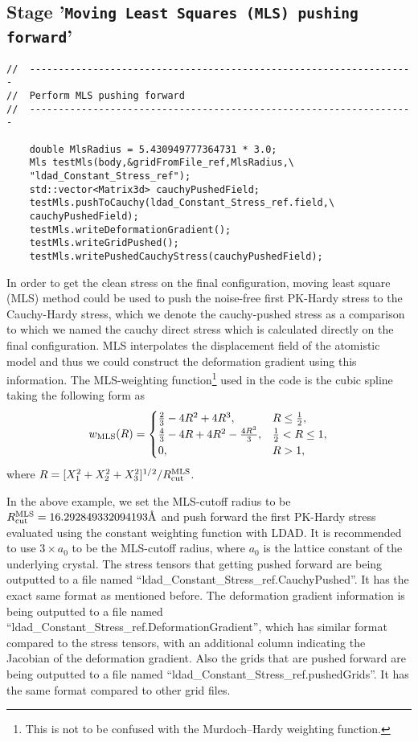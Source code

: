 \documentclass[authoryear]{elsarticle}
\newcommand{\ttt}{\texttt}
\begin{document}
\subsection{Stage \textnormal{'\ttt{Moving Least Squares (MLS) pushing forward}'}}
\begin{Verbatim}[frame=single]
//	-------------------------------------------------------------------
//	Perform MLS pushing forward
//	-------------------------------------------------------------------

	double MlsRadius = 5.430949777364731 * 3.0;
	Mls testMls(body,&gridFromFile_ref,MlsRadius,\
	"ldad_Constant_Stress_ref");
	std::vector<Matrix3d> cauchyPushedField;
	testMls.pushToCauchy(ldad_Constant_Stress_ref.field,\
	cauchyPushedField);
	testMls.writeDeformationGradient();
	testMls.writeGridPushed();
	testMls.writePushedCauchyStress(cauchyPushedField);
\end{Verbatim}

In order to get the clean stress on the final configuration, moving least square (MLS) method could be used to push the noise-free first PK-Hardy stress to the Cauchy-Hardy stress, which we denote the cauchy-pushed stress as a comparison to which we named the cauchy direct stress which is calculated directly on the final configuration.
MLS interpolates the displacement field of the atomistic model and thus we could construct the deformation gradient using this information.
The MLS-weighting function\footnote{This is not to be confused
with the Murdoch--Hardy weighting function.} used in the code is the cubic spline taking the following form as
\begin{equation}
\label{eqn:w^MLS}
w_{\rm{MLS}}(R) =
    \begin{cases}
    \frac {2} {3} - 4R^2 + 4R^3, & R \le \frac {1} {2}, \\
    \frac {4} {3} - 4R + 4R^2 - \frac {4R^3} {3}, & \frac {1} {2} < R \le 1, \\
    0, & R > 1,
    \end{cases}
\end{equation}
where $R = [X_1^2+X_2^2+X_3^2]^{1/2}/R_{\rm{cut}}^{\rm{MLS}}$.

In the above example, we set the MLS-cutoff radius to be $R_{\rm{cut}}^{\rm{MLS}} = 16.292849332094193\text{\AA}$ 
and push forward the first PK-Hardy stress evaluated using the constant weighting function with LDAD.
It is recommended to use $3 \times a_0$ to be the MLS-cutoff radius, where $a_0$ is the lattice constant of the underlying crystal.
The stress tensors that getting pushed forward are being outputted to a file named
``ldad\_Constant\_Stress\_ref.CauchyPushed''. It has the exact same format as mentioned before.
The deformation gradient information is being outputted to a file named ``ldad\_Constant\_Stress\_ref.DeformationGradient'', which has similar format compared to the stress tensors, 
with an additional column indicating the Jacobian of the deformation gradient.
Also the grids that are pushed forward are being outputted to a file named ``ldad\_Constant\_Stress\_ref.pushedGrids''.
It has the same format compared to other grid files.
\end{document}
